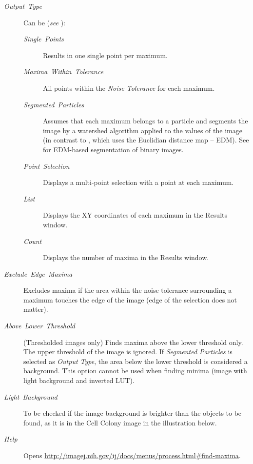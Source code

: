 \begin{description}
\item [{\emph{Output}\ \emph{Type}}] Can be (\emph{see} ):

\begin{description}
\item [{\emph{Single\ Points}}] Results in one single point per maximum.
\item [{\emph{Maxima}\ \emph{Within}\ \emph{Tolerance}}] All points within
the \emph{Noise Tolerance} for each maximum.
\item [{\emph{Segmented\ Particles}}] Assumes that each maximum belongs
to a particle and segments the image by a watershed
algorithm applied to the values of the image (in contrast to ,
which uses the Euclidian distance map
-- EDM). See 
for EDM-based segmentation of binary images.
\item [{\emph{Point}\ \emph{Selection}}] Displays a multi-point selection
with a point at each maximum.
\item [{\emph{List}}] Displays the XY coordinates of each maximum in the
Results window.
\item [{\emph{Count}}] Displays the number of maxima in the Results window.
\end{description}
\item [{\emph{Exclude\ Edge\ Maxima}}] Excludes maxima if the area within
the noise tolerance surrounding a maximum touches the edge of the
image (edge of the selection does not matter).
\item [{\emph{Above}\ \emph{Lower}\ \emph{Threshold}}] (Thresholded images
only) Finds maxima above the lower threshold only. The upper threshold
of the image is ignored. If \emph{Segmented Particles} is selected
as \emph{Output Type}, the area below the lower threshold is considered
a background. This option cannot be used when finding minima (image
with light background and inverted LUT).
\item [{\emph{Light\ Background}}] To be checked if the image background
is brighter than the objects to be found, as it is in the Cell Colony
image in the illustration below.
\item [{\emph{Help}}] Opens \href{http://imagej.nih.gov/ij/docs/menus/process.html\#find-maxima}{http://imagej.nih.gov/ij/docs/menus/process.html\#{}find-maxima}.
\end{description}
